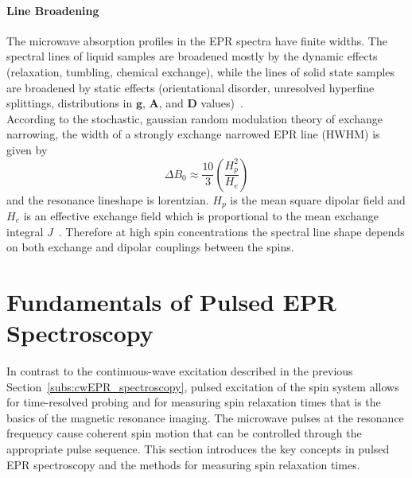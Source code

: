 \paragraph{Line Broadening}
The microwave absorption profiles in the EPR spectra have finite widths. The spectral lines of liquid samples are broadened mostly by the dynamic effects (relaxation, tumbling, chemical exchange), while the lines of solid state samples are broadened by static effects (orientational disorder, unresolved hyperfine splittings, distributions in $\textbf{g}$, $\textbf{A}$, and $\textbf{D}$ values)~\cite{Stoll2006}.\\

According to the stochastic, gaussian random modulation theory of exchange narrowing, the width of a strongly exchange narrowed EPR line (HWHM) is given by
\begin{equation}
\label{eq:exch_narrowing}
\Delta B_0 \approx\frac{10}{3}\left(\frac{H_p^2}{H_e}\right)
\end{equation}
and the resonance lineshape is lorentzian. $H_p$ is the mean square dipolar field and $H_e$ is an effective exchange field which is proportional to the mean exchange integral $J$~\cite{Oreilly_1971}. Therefore at high spin concentrations the spectral line shape depends on both exchange and dipolar couplings between the spins.\\



\section{Fundamentals of Pulsed EPR Spectroscopy}
\label{ch:pulsed_epr}

In contrast to the continuous-wave excitation described in the previous Section~\ref{subs:cwEPR_spectroscopy}, pulsed excitation of the spin system allows for time-resolved probing and for measuring spin relaxation times that is the basics of the magnetic resonance imaging. The microwave pulses at the resonance frequency cause coherent spin motion that can be controlled through the appropriate pulse sequence. This section introduces the key concepts in pulsed EPR spectroscopy and the methods for measuring spin relaxation times.

